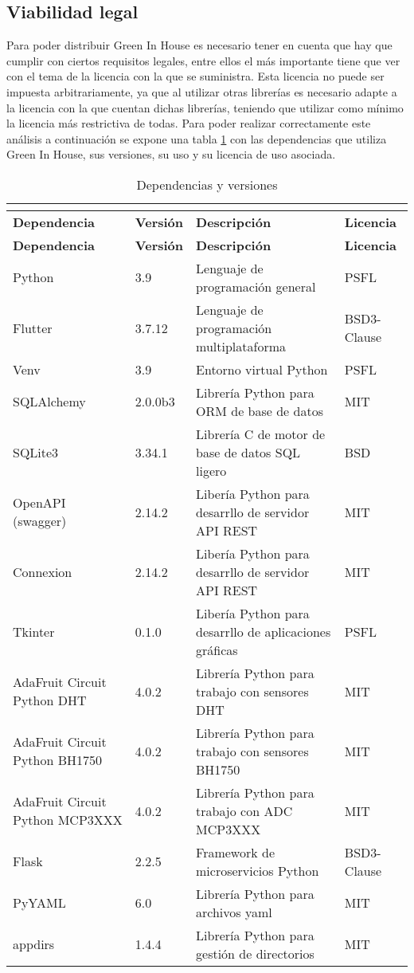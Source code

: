     
    \subsection{Viabilidad legal}
    Para poder distribuir Green In House es necesario tener en cuenta que hay que cumplir con ciertos requisitos legales, entre ellos el más importante tiene que ver con el tema de la licencia con la que se suministra. Esta licencia no puede ser impuesta arbitrariamente, ya que al utilizar otras librerías es necesario adapte a la licencia con la que cuentan dichas librerías, teniendo que utilizar como mínimo la licencia más restrictiva de todas. Para poder realizar correctamente este análisis a continuación se expone una tabla \ref{tab:Dependencias y versiones} con las dependencias que utiliza Green In House, sus versiones, su uso y su licencia de uso asociada. 

    \begin{longtable}{ p{} p{} p{} p{} }
	\caption{Dependencias y versiones}\\
        \label{tab:Dependencias y versiones}\\
	\hline
	\textbf{Dependencia} & \textbf{Versión} & \textbf{Descripción} & \textbf{Licencia}\\
	\hline
	\endfirsthead
	\textbf{Dependencia} & \textbf{Versión} & \textbf{Descripción} & \textbf{Licencia}\\
	\hline
	\endhead
	Python & 3.9 & Lenguaje de programación general & PSFL \\
	Flutter & 3.7.12 & Lenguaje de programación multiplataforma & BSD3-Clause \\
	Venv & 3.9 & Entorno virtual Python & PSFL \\
	SQLAlchemy & 2.0.0b3 & Librería Python para ORM de base de datos & MIT \\
	SQLite3 & 3.34.1 & Librería C de motor de base de datos SQL ligero & BSD \\
	OpenAPI (swagger) & 2.14.2 & Libería Python para desarrllo de servidor API REST & MIT \\
	Connexion & 2.14.2 & Libería Python para desarrllo de servidor API REST & MIT \\
	Tkinter & 0.1.0 & Libería Python para desarrllo de aplicaciones gráficas & PSFL \\
	AdaFruit Circuit Python DHT & 4.0.2 & Librería Python para trabajo con sensores DHT & MIT \\
	AdaFruit Circuit Python BH1750 & 4.0.2 & Librería Python para trabajo con sensores BH1750 & MIT \\
	AdaFruit Circuit Python MCP3XXX & 4.0.2 & Librería Python para trabajo con ADC MCP3XXX & MIT \\
	Flask & 2.2.5 & Framework de microservicios Python & BSD3-Clause \\
	PyYAML & 6.0 & Librería Python para archivos yaml & MIT \\
	appdirs & 1.4.4 & Librería Python para gestión de directorios & MIT \\
	\hline
    \end{longtable}

